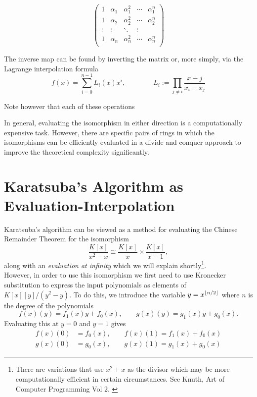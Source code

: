 \[
  \begin{pmatrix}
      1 & \alpha_1 & \alpha_1^2 & \cdots & \alpha_1^n\\
      1 & \alpha_2 & \alpha_2^2 & \cdots & \alpha_2^n\\
      \vdots & \vdots & \ddots & \vdots\\
      1 & \alpha_n & \alpha_n^2 & \cdots & \alpha_n^n\\
  \end{pmatrix}
\]

The inverse map can be found by inverting the matrix or, more simply, via the Lagrange interpolation formula
\[
    f(x) = \sum_{i=0}^{n-1} L_i(x)x^i, \qquad \qquad L_i := \prod_{j \neq i} \frac{x - j}{x_i - x_j} 
\]

Note however that each of these operations 

In general, evaluating the isomorphism in either direction is a computationally expensive task. However, there are specific pairs of rings in which the isomorphisms can be efficiently evaluated in a divide-and-conquer approach to improve the theoretical complexity significantly.

\section{Karatsuba's Algorithm as Evaluation-Interpolation}%
\label{sec:Karatsuba's Algorithms as Evaluation-Interpolation}

Karatsuba's algorithm can be viewed as a method for evaluating the Chinese Remainder Theorem for the isomorphism
\[
    \frac{K[x]}{x^2 - x} \cong \frac{K[x]}{x} \times \frac{K[x]}{x-1},
\]
along with an \emph{evaluation at infinity} which we will explain shortly\footnote{There are variations that use $x^2 + x$ as the divisor which may be more computationally efficient in certain circumstances. See Knuth, Art of Computer Programming Vol 2. \cite{knuthv2}}.\\
However, in order to use this isomorphism we first need to use Kronecker substitution to express the input polynomials as elements of $K[x][y]/(y^2 - y)$. To do this, we introduce the variable $y = x^{\left \lfloor n/2 \right \rfloor}$ where $n$ is the degree of the polynomials
\[
    f(x)(y) = f_1(x)y + f_0(x), \qquad g(x)(y) = g_1(x)y + g_0(x).
\]
Evaluating this at $y = 0$ and $y = 1$ gives
\begin{align*}
    f(x)(0) &= f_0(x), \qquad f(x)(1) = f_1(x) + f_0(x)\\
    g(x)(0) &= g_0(x), \qquad g(x)(1) = g_1(x) + g_0(x)
\end{align*}


